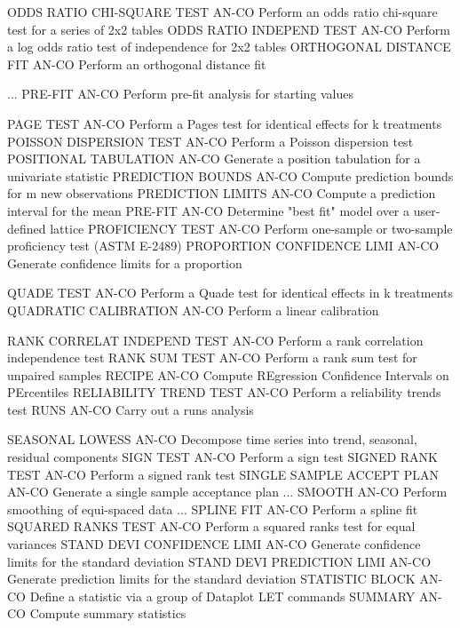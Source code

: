 ODDS RATIO CHI-SQUARE TEST  AN-CO Perform an odds ratio chi-square test for a series of 2x2 tables
ODDS RATIO INDEPEND TEST    AN-CO Perform a log odds ratio test of independence for 2x2 tables
ORTHOGONAL DISTANCE FIT     AN-CO Perform an orthogonal distance fit

... PRE-FIT                 AN-CO Perform pre-fit analysis for starting values

PAGE TEST                   AN-CO Perform a Pages test for identical effects for k treatments
POISSON DISPERSION TEST     AN-CO Perform a Poisson dispersion test
POSITIONAL TABULATION       AN-CO Generate a position tabulation for a univariate statistic
PREDICTION BOUNDS           AN-CO Compute prediction bounds for m new observations
PREDICTION LIMITS           AN-CO Compute a prediction interval for the mean
PRE-FIT                     AN-CO Determine "best fit" model over a user-defined lattice
PROFICIENCY TEST            AN-CO Perform one-sample or two-sample proficiency test (ASTM E-2489)
PROPORTION CONFIDENCE LIMI  AN-CO Generate confidence limits for a proportion

QUADE TEST                  AN-CO Perform a Quade test for identical effects in k treatments
QUADRATIC CALIBRATION       AN-CO Perform a linear calibration

RANK CORRELAT INDEPEND TEST AN-CO Perform a rank correlation independence test
RANK SUM TEST               AN-CO Perform a rank sum test for unpaired samples
RECIPE                      AN-CO Compute REgression Confidence Intervals on PErcentiles
RELIABILITY TREND TEST      AN-CO Perform a reliability trends test
RUNS                        AN-CO Carry out a runs analysis

SEASONAL LOWESS             AN-CO Decompose time series into trend, seasonal, residual components
SIGN TEST                   AN-CO Perform a sign test
SIGNED RANK TEST            AN-CO Perform a signed rank test
SINGLE SAMPLE ACCEPT PLAN   AN-CO Generate a single sample acceptance plan
... SMOOTH                  AN-CO Perform smoothing of equi-spaced data
... SPLINE FIT              AN-CO Perform a spline fit
SQUARED RANKS TEST          AN-CO Perform a squared ranks test for equal variances
STAND DEVI CONFIDENCE LIMI  AN-CO Generate confidence limits for the standard deviation
STAND DEVI PREDICTION LIMI  AN-CO Generate prediction limits for the standard deviation
STATISTIC BLOCK             AN-CO Define a statistic via a group of Dataplot LET commands
SUMMARY                     AN-CO Compute summary statistics

